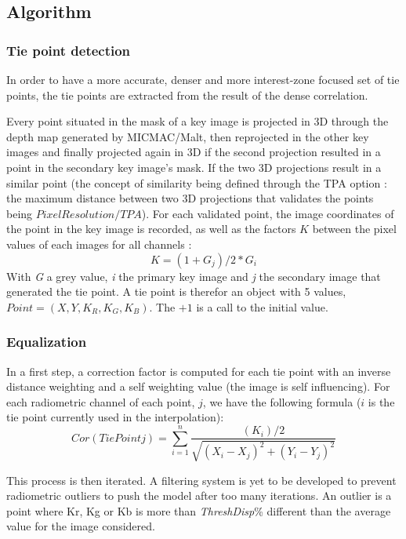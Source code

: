\subsection{Algorithm}

\subsubsection{Tie point detection}

In order to have a more accurate, denser and more interest-zone focused set of tie points, the tie points are extracted from the result of the dense correlation.


 Every point situated in the mask of a key image is projected in 3D through the depth map generated by MICMAC/Malt, then reprojected in the other key images and finally projected again in 3D if the second projection resulted in a point in the secondary key image's mask. If the two 3D projections result in a similar point (the concept of similarity being defined through the TPA option : the maximum distance between two 3D projections that validates the points being $PixelResolution/TPA$). For each validated point, the image coordinates of the point in the key image is recorded, as well as the factors $K$ between the pixel values of each images for all channels : \[K=(1+G_{j})/2*G_{i}\]
 With \textit{G} a grey value, \textit{i} the primary key image and \textit{j} the secondary image that generated the tie point. A tie point is therefor an object with 5 values, $Point=(X,Y,K_{R},K_{G},K_{B})$. The $+1$ is a call to the initial value.

\subsubsection{Equalization}

In a first step, a correction factor is computed for each tie point with an inverse distance weighting and a self weighting value (the image is self influencing). For each radiometric channel of each point, $j$, we have the following formula ($i$ is the tie point currently used in the interpolation):
\[Cor(TiePointj)=\sum_{i=1}^{n} \frac{(K_{i})/2}{\sqrt{(X_{i}-X_{j})^2+(Y_{i}-Y_{j})^2}}\]

This process is then iterated. A filtering system is yet to be developed to prevent radiometric outliers to push the model after too many iterations. An outlier is a point where Kr, Kg or Kb is more than \textit{ThreshDisp}\% different than the average value for the image considered.


